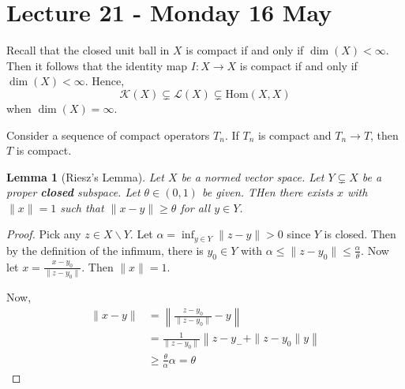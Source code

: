 \documentclass[10pt, reqno, oneside]{amsart}
\theoremstyle{plain}%
\newtheorem{lem}[thm]{Lemma}
\theoremstyle{definition}
\theoremstyle{remark}
\begin{document}
\section{Lecture 21 - Monday 16 May} %
\label{sec:lecture_21_monday_16_may}


Recall that the closed unit ball in $X$ is compact if and only if $\dim(X) < \infty$.  Then it follows that the identity map $I : X \rightarrow X$ is compact if and only if $\dim(X) < \infty$.  Hence, \[
	\mathcal K(X) \subsetneq \mathcal L(X) \subsetneq \text{Hom}(X, X) 
\] when $\dim(X) = \infty$.    

Consider a sequence of compact operators $T_n$.  If $T_n$ is compact and $T_n \rightarrow T$, then $T$ is compact.  

\begin{lem}[Riesz's Lemma]
	Let $X$ be a normed vector space.  Let $Y \subsetneq X$ be a proper \textbf{closed} subspace.  Let $\theta \in (0, 1)$ be given. THen there exists $x$ with $\| x \| = 1$ such that $\| x - y \| \geq \theta$ for all $y \in Y$.  
\end{lem}
\begin{proof}
	Pick any $z \in X \backslash Y$.  Let $\alpha = \inf_{y \in Y} \| z - y \| > 0$ since $Y$ is closed.  Then by the definition of the infimum, there is $y_0 \in Y$ with $\alpha \leq \| z - y_0 \| \leq \frac{\alpha}{\theta}$.  Now let $x = \frac{x - y_0}{\| z - y_0 \|}$.  Then $\| x \| = 1$.  
	
	Now, \begin{align*}
		\| x - y \| &= \left \| \frac{z - y_0}{\| z - y_0 \|} - y \right \| \\
					&= \frac{1}{\| z - y_0 \|} \left \| z - y_- + \| z - y_0 \| y \right \| \\
					&\geq \frac{\theta}{\alpha} \alpha = \theta
	\end{align*}
\end{proof}
\end{document}
